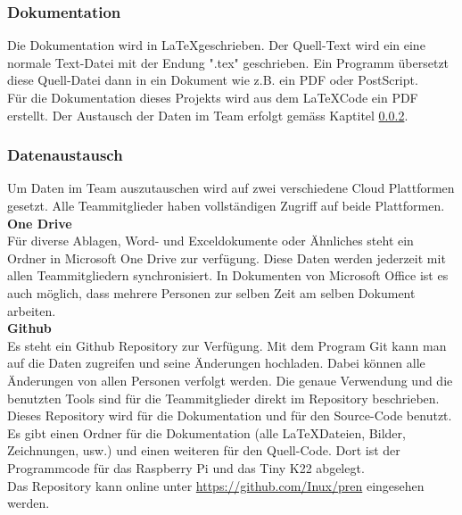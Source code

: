 \documentclass[../../main.tex]{subfiles}
\begin{document}
\subsubsection{Dokumentation}
Die Dokumentation wird in \LaTeX geschrieben. Der Quell-Text wird ein eine normale Text-Datei mit der Endung ".tex" geschrieben. Ein Programm übersetzt diese Quell-Datei dann in ein Dokument wie z.B. ein PDF oder PostScript. \cite{whatislatex}\\
Für die Dokumentation dieses Projekts wird aus dem \LaTeX Code ein PDF erstellt. Der Austausch der Daten im Team erfolgt gemäss Kaptitel \ref{proj_datenaustausch}.

\subsubsection{Datenaustausch} \label{proj_datenaustausch}
Um Daten im Team auszutauschen wird auf zwei verschiedene Cloud Plattformen gesetzt. Alle Teammitglieder haben vollständigen Zugriff auf beide Plattformen.\\

\textbf{One Drive}\\
Für diverse Ablagen, Word- und Exceldokumente oder Ähnliches steht ein Ordner in Microsoft One Drive zur verfügung. Diese Daten werden jederzeit mit allen Teammitgliedern synchronisiert. In Dokumenten von Microsoft Office ist es auch möglich, dass mehrere Personen zur selben Zeit am selben Dokument arbeiten.\\

\textbf{Github}\\
Es steht ein Github Repository zur Verfügung. Mit dem Program Git kann man auf die Daten zugreifen und seine Änderungen hochladen. Dabei können alle Änderungen von allen Personen verfolgt werden. Die genaue Verwendung und die benutzten Tools sind für die Teammitglieder direkt im Repository beschrieben.\\
Dieses Repository wird für die Dokumentation und für den Source-Code benutzt. Es gibt einen Ordner für die Dokumentation (alle \LaTeX Dateien, Bilder, Zeichnungen, usw.) und einen weiteren für den Quell-Code. Dort ist der Programmcode für das Raspberry Pi und das Tiny K22 abgelegt.\\
Das Repository kann online unter \url{https://github.com/Inux/pren} eingesehen werden.
\end{document}
